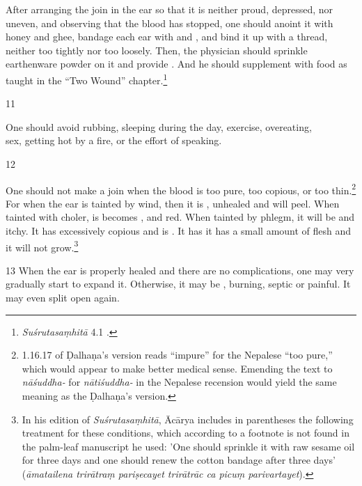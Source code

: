 \begin{translation}
After arranging the join in the ear so that it is neither proud, depressed, nor
uneven, and observing that the blood has stopped, one should anoint it with
honey and ghee, bandage each ear with  and , and
bind it up with a thread, neither too tightly nor too loosely.  Then, the
physician should sprinkle earthenware powder on it and  provide
. And he should supplement with food as taught in  the
“Two Wound” chapter.\footnote{\emph{Suśrutasaṃhitā} 4.1 \citep[396–408]{vulgate}.}
    
\item[11]
\begin{sloka}
        One should avoid rubbing, sleeping during the day, exercise, overeating,\\
        sex, getting hot by a fire, or the effort of speaking.
    \end{sloka}

\item[12]
    
One should not make a join when the blood is too pure, too copious, or too
thin.\footnote{1.16.17 of Ḍalhaṇa's version \citep[79]{vulgate} reads “impure” for
    the Nepalese “too pure,” which would appear to make better medical sense. 
    Emending the text to \emph{nāśuddha-} for \emph{nātiśuddha-} in the Nepalese
    recension would yield the same meaning as the Ḍalhaṇa's version.} For when the ear
    is tainted by wind, then it is , unhealed and
    will peel. When tainted with choler, is becomes ,
     and red.  When tainted by phlegm, it will be 
    and itchy.  It has excessively copious  and is .  It has it has a small amount of  flesh and it will
    not grow.\footnote{In his edition of \emph{Suśrutasaṃhitā}, Ācārya \citep[79 n.
        1]{vulgate} includes in parentheses the following treatment for these conditions,
        which according to a footnote is not found in the palm-leaf manuscript he used:
        'One should sprinkle it with raw sesame oil for three days and one should renew
        the cotton bandage after three days' (\emph{āmatailena trirātraṃ pariṣecayet
        trirātrāc ca picuṃ parivartayet}).}
    
\item[13] When the ear is properly healed and there are no complications,  one may
very gradually start to expand it.  Otherwise, it may be ,
burning, septic or painful.  It may even split open again.
    

\end{translation}

